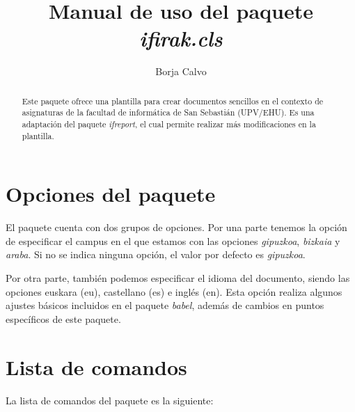 \documentclass[eu]{ifirak}
\begin{document}
\title{Manual de uso del paquete \textit{ifirak.cls}}
\author{Borja Calvo}

\maketitle

\begin{abstract}
Este paquete ofrece una plantilla para crear documentos sencillos en el contexto de asignaturas de la facultad de inform\'atica de San Sebasti\'an (UPV/EHU). Es una adaptaci\'on del paquete \textit{ifreport}, el cual permite realizar m\'as modificaciones en la plantilla.
\end{abstract}

\section{Opciones del paquete}
El paquete cuenta con dos grupos de opciones. Por una parte tenemos la opci\'on de especificar el campus en el que estamos con las opciones \textit{gipuzkoa}, \textit{bizkaia} y \textit{araba}. Si no se indica ninguna opci\'on, el valor por defecto es \textit{gipuzkoa}.

Por otra parte, tambi\'en podemos especificar el idioma del documento, siendo las opciones euskara (eu), castellano (es) e ingl\'es (en). Esta opci\'on realiza algunos ajustes b\'asicos incluidos en el paquete \textit{babel}, adem\'as de cambios en puntos espec\'ificos de este paquete.

\section{Lista de comandos}

La lista de comandos del paquete es la siguiente:
\end{document}
